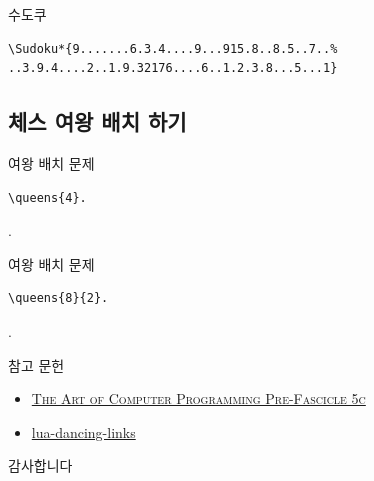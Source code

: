 \documentclass[xcolor=svgnames]{beamer}
\begin{document}
%
\begin{frame}[fragile]{수도쿠}
\begin{verbatim}
\Sudoku*{9.......6.3.4....9...915.8..8.5..7..%
..3.9.4....2..1.9.32176....6..1.2.3.8...5...1}
\end{verbatim}
\begin{center}
\end{center}
\end{frame}


\subsection{체스 여왕 배치 하기}

%
\begin{frame}[fragile]{여왕 배치 문제}
\begin{verbatim}
\queens{4}.
\end{verbatim}
\vspace{-10mm}
.
\end{frame}

%
\begin{frame}[fragile]{여왕 배치 문제}
\begin{verbatim}
\queens{8}{2}.
\end{verbatim}
\vspace{-10mm}
.
\end{frame}


%
\begin{frame}{참고 문헌}
  \begin{itemize}
  \item \href{http://www-cs-faculty.stanford.edu/~knuth/fasc5c.ps.gz}
    {\textsc{The Art of Computer Programming Pre-Fascicle 5c}}
  \item \href{https://github.com/sjnam/lua-dancing-links}
    {lua-dancing-links}
  \end{itemize}
\end{frame}

%
\begin{frame}[standout]
  감사합니다
\end{frame}
\end{document}
